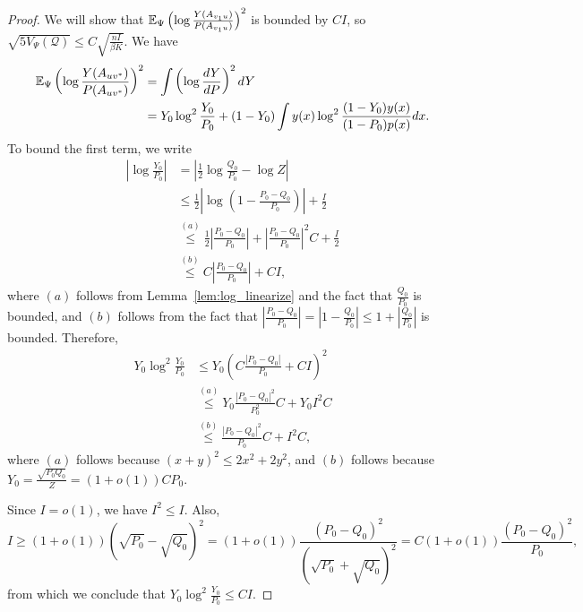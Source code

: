 \documentclass{article}
\begin{document}
\begin{proof}
We will show that ${\mathbb E}_{\Psi} \left( \log \frac{Y(A_{v_1 u})}{P(A_{v_1 u})} \right)^2$ is bounded by $C I$, so $\sqrt{ 5 V_{\Psi}(\mathcal{Q})} \leq C \sqrt{\frac{nI}{\beta K}} $. We have
\begin{align}
{\mathbb E}_{\Psi} \left( \log \frac{Y(A_{uv^*})}{P(A_{uv^*})} \right)^2 &= 
    \int \left( \log \frac{dY}{dP} \right)^2 dY \nonumber \\
  &= Y_0 \log^2 \frac{Y_0}{P_0} + (1-Y_0) \int y(x) \log^2 \frac{(1-Y_0) y(x)}{(1-P_0)p(x)} dx. \label{eqn:lower_bound_var_terms}
\end{align}
To bound the first term, we write
\begin{align*}
\left| \log \frac{Y_0}{P_0} \right|&= \left| \frac{1}{2} \log \frac{Q_0}{P_0} - \log Z \right| \\
    &\leq \frac{1}{2} \left| \log \left( 1 - \frac{P_0 - Q_0}{P_0} \right) \right| + \frac{I}{2} \\ 
   & \stackrel{(a)} \leq \frac{1}{2} \left| \frac{P_0 - Q_0 }{P_0} \right| + \left| \frac{P_0 - Q_0}{P_0} \right|^2 C + \frac{I}{2} \\   
   & \stackrel{(b)} \leq C \left| \frac{P_0 - Q_0}{P_0} \right| + C I,
\end{align*}
where $(a)$ follows from Lemma~\ref{lem:log_linearize} and the fact that $\frac{Q_0}{P_0}$ is bounded, and $(b)$ follows from the fact that $\left| \frac{ P_0 - Q_0}{P_0} \right| = \left| 1 - \frac{Q_0}{P_0} \right| \leq 1 + \left| \frac{Q_0}{P_0} \right|$ is bounded. Therefore,
\begin{align*}
Y_0 \log^2 \frac{Y_0}{P_0} &\leq Y_0 \left( C \frac{ |P_0 - Q_0| }{P_0} + C I \right)^2 \\
     &\stackrel{(a)} \leq Y_0 \frac{|P_0 - Q_0|^2}{P_0^2 } C + Y_0 I^2 C \\
     &\stackrel{(b)} \leq \frac{|P_0 - Q_0|^2}{P_0} C + I^2 C,
\end{align*}
where $(a)$ follows because $(x + y)^2 \leq 2x^2 + 2y^2$, and $(b)$ follows because $Y_0 = \frac{\sqrt{P_0 Q_0}}{Z} = (1+o(1)) C P_0$. 

Since $I = o(1)$, we have $I^2 \leq I$. Also,
\begin{equation*}
I \geq (1+o(1)) ( \sqrt{P_0} - \sqrt{Q_0})^2 = (1+o(1)) \frac{ (P_0 - Q_0)^2}{(\sqrt{P_0} + \sqrt{Q_0})^2} = C (1 + o(1)) \frac{ (P_0 - Q_0)^2 }{P_0},
\end{equation*}
from which we conclude that $Y_0 \log^2 \frac{Y_0}{P_0} \leq C I$.


\end{proof}
\end{document}
